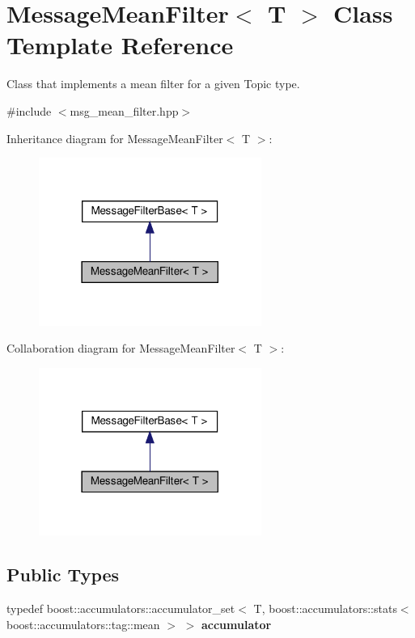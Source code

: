 \hypertarget{classMessageMeanFilter}{}\section{Message\+Mean\+Filter$<$ T $>$ Class Template Reference}
\label{classMessageMeanFilter}


Class that implements a mean filter for a given Topic type.  




{\ttfamily \#include $<$msg\+\_\+mean\+\_\+filter.\+hpp$>$}



Inheritance diagram for Message\+Mean\+Filter$<$ T $>$\+:\nopagebreak
\begin{figure}[H]
\begin{center}
\leavevmode
\includegraphics[width=206pt]{dd/d60/classMessageMeanFilter__inherit__graph}
\end{center}
\end{figure}


Collaboration diagram for Message\+Mean\+Filter$<$ T $>$\+:\nopagebreak
\begin{figure}[H]
\begin{center}
\leavevmode
\includegraphics[width=206pt]{d2/db9/classMessageMeanFilter__coll__graph}
\end{center}
\end{figure}
\subsection*{Public Types}
\begin{DoxyCompactItemize}
\item 
\mbox{\label{classMessageMeanFilter_aabbf6eb4a2e2251228ece38f88609d29}} 
typedef boost\+::accumulators\+::accumulator\+\_\+set$<$ T, boost\+::accumulators\+::stats$<$ boost\+::accumulators\+::tag\+::mean $>$ $>$ {\bfseries accumulator}
\end{DoxyCompactItemize}
